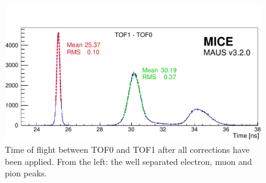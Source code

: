 


\begin{figure}[!htb]
  \begin{center}
    \includegraphics[width=0.6\columnwidth]{TOF_peaks.pdf}
    \caption{Time of flight between TOF0 and TOF1 after all corrections have been applied. From the left: the well separated electron, muon and pion peaks.}
    \label{fig:TOF_peaks}
  \end{center}
\end{figure}

